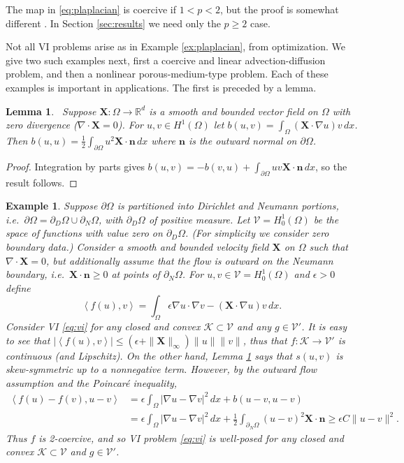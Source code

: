 \documentclass[letterpaper,final,12pt,reqno]{amsart}
\theoremstyle{cstyle}
\newtheorem{lemma}[theorem]{Lemma}
\theoremstyle{cstyle*}
\theoremstyle{dstyle}
\newtheorem{example}[theorem]{Example}
\numberwithin{equation}{section}
\numberwithin{figure}{section}
\numberwithin{table}{section}
\numberwithin{theorem}{section}
\newcommand{\eps}{\epsilon}
\newcommand{\RR}{\mathbb{R}}
\newcommand{\grad}{\nabla}
\newcommand{\Div}{\nabla\cdot}
\newcommand{\bn}{\mathbf{n}}
\newcommand{\bX}{\mathbf{X}}
\newcommand{\cK}{\mathcal{K}}
\newcommand{\cV}{\mathcal{V}}
\newcommand{\ip}[2]{\left<#1,#2\right>}
\begin{document}
The map in \eqref{eq:plaplacian} is coercive if $1<p<2$, but the proof is somewhat different \cite[Theorem 4.4]{Bueler2021conservation}.  In Section \ref{sec:results} we need only the $p\ge 2$ case.

Not all VI problems arise as in Example \ref{ex:plaplacian}, from optimization.  We give two such examples next, first a coercive and linear advection-diffusion problem, and then a nonlinear porous-medium-type problem.  Each of these examples is important in applications.  The first is preceded by a lemma.

\begin{lemma}  \label{lem:advectionskew}  \cite{Elmanetal2014}\,  Suppose $\bX :\Omega \to \RR^d$ is a smooth and bounded vector field on $\Omega$ with zero divergence ($\Div \bX=0$).  For $u,v \in H^1(\Omega)$ let $b(u,v) = \int_\Omega (\bX \cdot \grad u) v\,dx$.  Then $b(u,u) = \frac{1}{2} \int_{\partial \Omega} u^2 \bX\cdot \bn\,dx$ where $\bn$ is the outward normal on $\partial \Omega$.
\end{lemma}

\begin{proof}
Integration by parts gives $b(u,v) = - b(v,u) + \int_{\partial \Omega} uv \bX\cdot \bn\,dx$, so the result follows.
\end{proof}

\begin{example}  \label{ex:advectiondiffusion}  Suppose $\partial\Omega$ is partitioned into Dirichlet and Neumann portions, i.e.~$\partial\Omega = \partial_D\Omega \cup \partial_N\Omega$, with $\partial_D\Omega$ of positive measure.  Let $\cV = H_0^1(\Omega)$ be the space of functions with value zero on $\partial_D\Omega$.  (For simplicity we consider zero boundary data.)  Consider a smooth and bounded velocity field $\bX$ on $\Omega$ such that $\Div \bX=0$, but additionally assume that the flow is outward on the Neumann boundary, i.e.~$\bX \cdot \bn \ge 0$ at points of $\partial_N\Omega$.  For $u,v \in \cV = H_0^1(\Omega)$ and $\eps>0$ define
\begin{equation}
\ip{f(u)}{v} = \int_\Omega \eps \grad u \cdot \grad v - (\bX \cdot \grad u) v\,dx. \label{eq:advectiondiffusion}
\end{equation}
Consider VI \eqref{eq:vi} for any closed and convex $\cK \subset \cV$ and any $g\in\cV'$.  It is easy to see that $|\ip{f(u)}{v}| \le (\eps + \|\bX\|_\infty) \|u\| \|v\|$, thus that $f:\cK \to \cV'$ is continuous (and Lipschitz).  On the other hand, Lemma \ref{lem:advectionskew} says that $s(u,v)$ is skew-symmetric up to a nonnegative term.  However, by the outward flow assumption and the Poincar\'e inequality,
\begin{align*}
\ip{f(u)-f(v)}{u-v} &= \eps \int_\Omega |\grad u - \grad v|^2\,dx + b(u-v,u-v) \\
                    &= \eps \int_\Omega |\grad u - \grad v|^2\,dx + \frac{1}{2} \int_{\partial_N\Omega} (u-v)^2 \bX\cdot\bn \ge \eps C \|u-v\|^2.
\end{align*}
Thus $f$ is 2-coercive, and so VI problem \eqref{eq:vi} is well-posed for any closed and convex $\cK \subset \cV$ and $g\in \cV'$.
\end{example}
\end{document}
